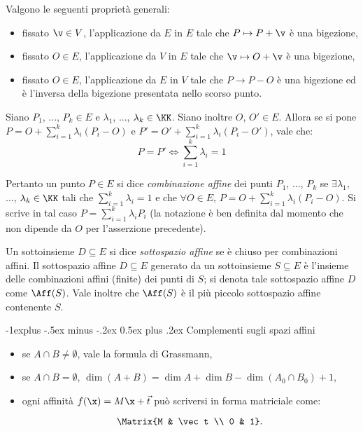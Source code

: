 \documentclass[10pt,landscape]{article}
\makeatletter
\renewcommand{\subsection}{\@startsection{subsection}{2}{0mm}%
	{-1explus -.5ex minus -.2ex}%
	{0.5ex plus .2ex}%
	{\normalfont\normalsize\bfseries}}
\makeatother
\begin{document}
\begin{multicols}{3}
		Valgono le seguenti proprietà generali:
		\begin{itemize}
			\item fissato $\v \in V$, l'applicazione da $E$ in $E$ tale che $P \mapsto P+\v$ è una bigezione,
			\item fissato $O \in E$, l'applicazione da $V$ in $E$ tale che $\v \mapsto O+\v$ è una bigezione,
			\item fissato $O \in E$, l'applicazione da $E$ in $V$ tale che $P \rightarrow P-O$ è una bigezione ed è l'inversa della bigezione presentata nello scorso punto.
		\end{itemize}
		
		Siano $P_1$, ..., $P_k \in E$ e $\lambda_1$, ..., $\lambda_k \in \KK$. Siano inoltre
		$O$, $O' \in E$. Allora se si pone $P=O+\sum_{i=1}^{k}\lambda_i (P_i-O)$ e $P'=O'+\sum_{i=1}^{k}\lambda_i (P_i-O')$, vale che:
		\[P=P'\iff\sum_{i=1}^{k}\lambda_i=1\]
		
		Pertanto un punto $P\in E$ si dice \textit{combinazione affine} dei punti $P_1$, ..., $P_k$ se $\exists \lambda_1$, ..., $\lambda_k \in \KK$ tali che $\sum_{i=1}^{k}\lambda_i=1$ e che $\forall O \in E$,
		$P=O+\sum_{i=1}^{k}\lambda_i (P_i-O)$. Si scrive in tal caso $P=\sum_{i=1}^{k}\lambda_i P_i$ (la notazione è ben definita dal momento che
		non dipende da $O$ per l'asserzione precedente).
		
		Un sottoinsieme $D\subseteq E$ si dice \textit{sottospazio affine} se è chiuso per combinazioni affini. Il sottospazio affine $D \subseteq E$ generato da un sottoinsieme $S \subseteq E$ è l'insieme delle combinazioni affini (finite) dei punti di $S$;
		si denota tale sottospazio affine $D$ come $\Aff(S)$. Vale inoltre che $\Aff(S)$ è il
		più piccolo sottospazio affine contenente $S$.
				
		\subsection{Complementi sugli spazi affini}
		
		\begin{itemize}
			\item se $A \cap B \neq \emptyset$, vale la formula di Grassmann,
			\item se $A \cap B = \emptyset$, $\dim (A + B) = \dim A + \dim B - \dim (A_0 \cap B_0) + 1$,
			\item ogni affinità $f(\x) = M \x + \vec t$ può scriversi in forma matriciale
			come:
			
			\[ \Matrix{M & \vec t \\ 0 & 1}. \]
		\end{itemize}
		

\end{multicols}
\end{document}
